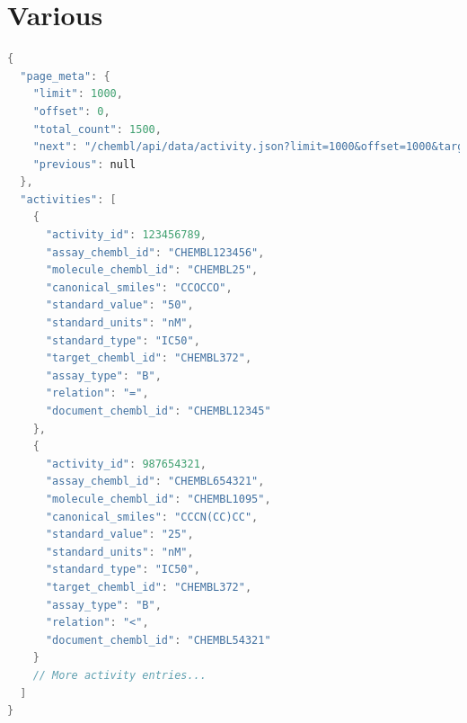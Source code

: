 \documentclass[12pt,letterpaper]{article}
\begin{document}
\newpage
\section{Various}

\begin{lstlisting}[language=C, caption=Example of a JSON file.]
{
  "page_meta": {
    "limit": 1000,
    "offset": 0,
    "total_count": 1500,
    "next": "/chembl/api/data/activity.json?limit=1000&offset=1000&target_chembl_id=CHEMBL372&standard_type=IC50",
    "previous": null
  },
  "activities": [
    {
      "activity_id": 123456789,
      "assay_chembl_id": "CHEMBL123456",
      "molecule_chembl_id": "CHEMBL25",
      "canonical_smiles": "CCOCCO",
      "standard_value": "50",
      "standard_units": "nM",
      "standard_type": "IC50",
      "target_chembl_id": "CHEMBL372",
      "assay_type": "B",
      "relation": "=",
      "document_chembl_id": "CHEMBL12345"
    },
    {
      "activity_id": 987654321,
      "assay_chembl_id": "CHEMBL654321",
      "molecule_chembl_id": "CHEMBL1095",
      "canonical_smiles": "CCCN(CC)CC",
      "standard_value": "25",
      "standard_units": "nM",
      "standard_type": "IC50",
      "target_chembl_id": "CHEMBL372",
      "assay_type": "B",
      "relation": "<",
      "document_chembl_id": "CHEMBL54321"
    }
    // More activity entries...
  ]
}
\end{lstlisting}

\newpage


% 
 
\end{document}
